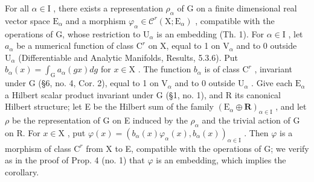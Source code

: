For all \(\alpha \in \mathrm{I}\) , there exists a representation \(\rho_{\alpha}\) of G on a finite dimensional real vector space \(\mathrm{E}_{\alpha}\) and a morphism \(\varphi_{\alpha} \in \mathcal{C}^r (\mathrm{X};\mathrm{E}_{\alpha})\) , compatible with the operations of G, whose restriction to \(\mathrm{U}_{\alpha}\) is an embedding (Th. 1). For \(\alpha \in \mathrm{I}\) , let \(a_{\alpha}\) be a numerical function of class \(\mathrm{C}^r\) on X, equal to 1 on \(\mathrm{V}_{\alpha}\) and to 0 outside \(\mathrm{U}_{\alpha}\) (Differentiable and Analytic Manifolds, Results, 5.3.6). Put \(b_{\alpha}(x) = \int_{\mathrm{G}} a_{\alpha}(gx) dg\) for \(x \in \mathrm{X}\) . The function \(b_{\alpha}\) is of class \(\mathrm{C}^r\) , invariant under G (§6, no. 4, Cor. 2), equal to 1 on \(\mathrm{V}_{\alpha}\) and to 0 outside \(\mathrm{U}_{\alpha}\) . Give each \(\mathrm{E}_{\alpha}\) a Hilbert scalar product invariant under G (§1, no. 1), and R its canonical Hilbert structure; let E be the Hilbert sum of the family \((\mathrm{E}_{\alpha} \oplus \mathbf{R})_{\alpha \in \mathrm{I}}\) , and let \(\rho\) be the representation of G on E induced by the \(\rho_{\alpha}\) and the trivial action of G on R. For \(x \in \mathrm{X}\) , put \(\varphi(x) = (b_{\alpha}(x)\varphi_{\alpha}(x), b_{\alpha}(x))_{\alpha \in \mathrm{I}}\) . Then \(\varphi\) is a morphism of class \(\mathrm{C}^r\) from X to E, compatible with the operations of G; we verify as in the proof of Prop. 4 (no. 1) that \(\varphi\) is an embedding, which implies the corollary.

